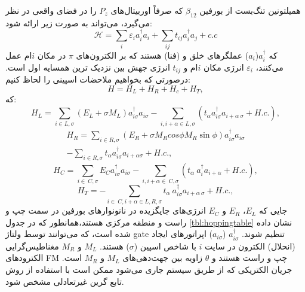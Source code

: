 همیلتونین تنگ‌بست از ‌بورفین $\beta_{12}$ که صرفاً اوربیتال‌های $P_z$ را در فضای واقعی در نظر ‌می‌گیرد، ‌می‌تواند به صورت زیر ارائه شود:
\begin{equation}
  \mathcal{H}=\sum_{i}\varepsilon_i a_i^\dagger a_i +\sum_{ij} t_{ij}a_i^\dagger a_j+c.c
\end{equation}
که $a_i^\dagger$($a_i$) عملگرهای خلق و (فنا) هستند که بر الکترون‌های $\pi$ در مکان $i$ام عمل ‌می‌کنند، $\varepsilon_i$ انرژی مکان $i$ام و $t_{ij}$ انرژی جهش بین نزدیک ترین همسایه اول است.
درصورتی که بخواهیم ملاحضات اسپینی را لحاظ کنیم:
\begin{equation}
  H= H_L + H_R + H_c + H_T,
\end{equation}
که:
\begin{equation}
H_{L}=\sum\limits_{i\in L,\sigma }{\left( E_{L}+\sigma M_{L} \right)} a_{i\sigma }^{\dagger} a_{i\sigma }-\sum\limits_{i,i+\alpha \in L,\sigma}{\left( t_{\alpha } a_{i\sigma}^{\dagger} a_{i+\alpha \ \sigma }+H.c.\right)},
\end{equation}
\begin{equation}
\begin{split}
H_{R}=\sum_{i\in R,\sigma}{\left( E_{R}+\sigma M_{R} cos\phi M_{R}\sin \phi\right)} a_{i\sigma}^{\dagger} a_{i\sigma } \\
-\sum_{i\in R,\sigma} t_{\alpha } a_{i\sigma}^{\dagger} a_{i+\alpha\sigma}+H.c.,
\end{split}
\end{equation}
\begin{equation}
H_{C}=\sum_{i\in \ C,\sigma }{{{E}_{C}}}a_{i\sigma }^{\dagger}{{a}_{i\sigma }}-\sum_{i,i+\alpha \in \ C,\sigma }{({{t}_{\alpha }}\ a_{i}^{\dagger }{{a}_{i+\alpha }}+H.c.)},
\end{equation}
\begin{equation}
H_{T}=-\sum_{i\in \ C,i+\alpha \in L,R,\sigma}{{{t}_{\alpha }}}\ a_{i\sigma }^{\dagger }{{a}_{i+\alpha \ \sigma }}+H.c.,
\end{equation}
جایی که $E_L$، $E_R$ و $E_C$ انرژی‌های جایگزیده در نانونوارهای ‌بورفین در سمت چپ و راست و منطقه مرکزی هستند،همانطور که در جدول \ref{tbl:hoppingtable} نشان داده شده است، که ‌می‌‌توانند توسط ولتاژ \gls{gate} تنظیم شوند. $a^{\dagger}_{i\sigma}$ ($a_{i\sigma}$) اپراتورهای ایجاد (انحلال) الکترون در سایت $i$ با شاخص اسپین ($\sigma$) هستند. $M_L$ و $M_R$ مغناطیس‌گرایی الکترودهای \gls{FM} چپ و راست هستند و $\theta$ زاویه بین جهت‌دهی‌های $M_L$ و $M_R$ است. جریان الکتریکی که از طریق سیستم جاری ‌می‌‌شود ممکن است با استفاده از روش تابع گرین غیرتعادلی مشخص شود.

